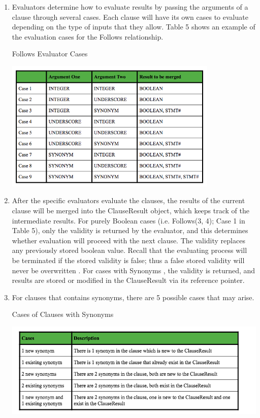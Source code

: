\documentclass[12pt]{article}
\begin{document}
{{{{{{{{{{\begin{enumerate}
\item Evaluators determine how to evaluate results by passing the arguments of a clause through several cases. Each clause will have its own cases to evaluate depending on the type of inputs that they allow. Table 5 shows an example of the evaluation cases for the Follows relationship.
\begin{table}[!htbp]
  \centering 
  \caption{Follows Evaluator Cases}
 \includegraphics[width=0.8\textwidth]{FollowsEvaluatorCases.png}
\end{table}
\item After the specific evaluators evaluate the clauses, the results of the current clause will be merged into the ClauseResult object, which keeps track of the intermediate results. For purely  Boolean  cases (i.e. Follows(3, 4); Case 1 in Table 5), only the validity is returned by the evaluator, and this determines whether evaluation will proceed with the next clause. The validity replaces any previously stored boolean value. Recall that the evaluating process will be terminated if the stored validity is false; thus a false stored validity will never be overwritten . For cases with  Synonyms , the validity is returned,   and   results   are   stored   or   modified   in   the   ClauseResult   via   its   reference   pointer.
\item For clauses that contains synonyms, there are 5 possible cases that may arise.
\begin{table}[!htbp]
  \centering 
  \caption{Cases of Clauses with Synonyms}
 \includegraphics[width=1.0\textwidth]{SynonymClauses.png}

\end{table}
\end{enumerate}}}}}}}}}}}
\end{document}
